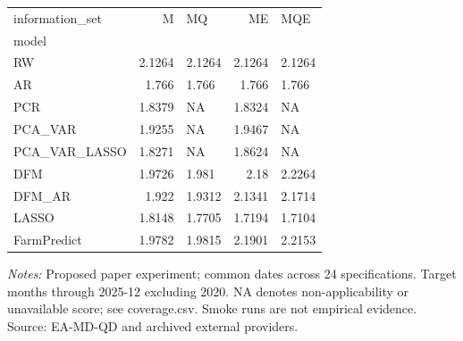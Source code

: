 \begin{threeparttable}
\begin{tabular}{lrlrl}
\toprule
information\_set & M & MQ & ME & MQE \\
model &  &  &  &  \\
\midrule
RW & 2.1264 & 2.1264 & 2.1264 & 2.1264 \\
AR & 1.766 & 1.766 & 1.766 & 1.766 \\
PCR & 1.8379 & NA & 1.8324 & NA \\
PCA\_VAR & 1.9255 & NA & 1.9467 & NA \\
PCA\_VAR\_LASSO & 1.8271 & NA & 1.8624 & NA \\
DFM & 1.9726 & 1.981 & 2.18 & 2.2264 \\
DFM\_AR & 1.922 & 1.9312 & 2.1341 & 2.1714 \\
LASSO & 1.8148 & 1.7705 & 1.7194 & 1.7104 \\
FarmPredict & 1.9782 & 1.9815 & 2.1901 & 2.2153 \\
\bottomrule
\end{tabular}
\begin{tablenotes}[flushleft]\footnotesize
\item \textit{Notes:} Proposed paper experiment; common dates across 24 specifications. Target months through 2025-12 excluding 2020. NA denotes non-applicability or unavailable score; see coverage.csv. Smoke runs are not empirical evidence. Source: EA-MD-QD and archived external providers.
\end{tablenotes}
\end{threeparttable}
